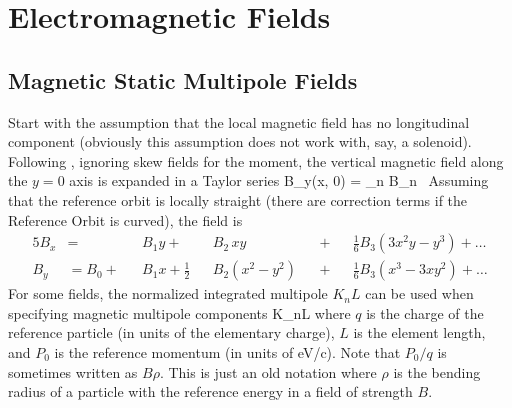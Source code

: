 \chapter{Electromagnetic Fields}

\section{Magnetic Static Multipole Fields}
\label{s:mag.field}

Start with the assumption that the local magnetic field has no longitudinal component
(obviously this assumption does not work with, say, a solenoid).  Following \mad, ignoring
skew fields for the moment, the vertical magnetic field along the $y = 0$ axis is expanded
in a Taylor series
\Begineq
  B_y(x, 0) = \sum_n B_n \, 
  \label{byx0b}
\Endeq
Assuming that the reference orbit is locally straight (there are correction terms if the
Reference Orbit is curved), the field is
\begin{alignat}{5}
  B_x &=           &&B_1 y \plus         &&B_2 \, xy       
                   && \plus && \frac{1}{6} B_3 (3x^2 y - y^3) \plus \ldots \\
  B_y &= B_0 \plus &&B_1 x + \frac{1}{2} &&B_2 (x^2 - y^2) 
                   && \plus && \frac{1}{6} B_3 (x^3 - 3x y^2) \plus \ldots
\end{alignat}
For some fields, the normalized integrated multipole $K_nL$ can be used when specifying
magnetic multipole components
\Begineq
  K_nL \equiv {}
\Endeq
where $q$ is the charge of the reference particle (in units of the elementary charge), $L$
is the element length, and $P_0$ is the reference momentum (in units of eV/c).  Note that
$P_0/q$ is sometimes written as $B\rho$. This is just an old notation where $\rho$ is the
bending radius of a particle with the reference energy in a field of strength $B$.

